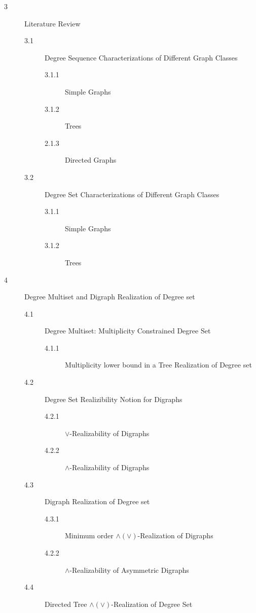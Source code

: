 \begin{description}
  \item[3] Literature Review
           \begin{description}
              \item[3.1] Degree Sequence Characterizations of Different Graph Classes
                   \begin{description}
                    \item[3.1.1] Simple Graphs
                    \item[3.1.2] Trees
                    \item[2.1.3] Directed Graphs
                   \end{description}
              \item[3.2] Degree Set Characterizations of Different Graph Classes
                   \begin{description}
                    \item[3.1.1] Simple Graphs
                    \item[3.1.2] Trees
                   \end{description}
           \end{description}


 \item[4] Degree Multiset and Digraph Realization of Degree set
            \begin{description}
               \item[4.1] Degree Multiset: Multiplicity Constrained Degree Set
                   \begin{description}
                     \item[4.1.1] Multiplicity lower bound in a Tree Realization of Degree set
                   \end{description}
               \item[4.2] Degree Set Realizibility Notion for Digraphs
                   \begin{description}
                     \item[4.2.1] $\lor$-Realizability of Digraphs
                     \item[4.2.2] $\land$-Realizability of Digraphs
                   \end{description}
               \item[4.3] Digraph Realization of Degree set
                    \begin{description}
                     \item[4.3.1] Minimum order $\land(\lor)$-Realization of Digraphs
                     \item[4.2.2] $\land$-Realizability of Asymmetric Digraphs
                   \end{description}
               \item[4.4] Directed Tree $\land(\lor)$-Realization of Degree Set
            \end{description}


\end{description}
